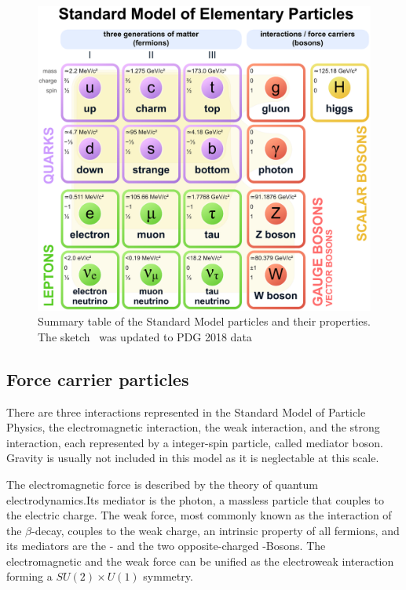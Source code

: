 \begin{figure}
	\centering
	\includegraphics[width=\textwidth]{figures_SM/standard_model.eps}
	\caption[Standard Model particles]{Summary table of the Standard Model particles and their properties. The sketch~\cite{standard_model} was updated to PDG 2018 data~\cite{PDG}}
	\label{fig:sm}
\end{figure}



\subsection{Force carrier particles}

There are three interactions represented in the Standard Model of Particle Physics, the electromagnetic interaction, the weak interaction, and the strong interaction, each represented by a integer-spin particle, called mediator boson. Gravity is usually not included in this model as it is neglectable  at this scale. 

The electromagnetic force is described by the theory of quantum electrodynamics.Its mediator is the photon, a massless particle that couples to the electric charge.
The weak force, most commonly known as the interaction of the $\beta$-decay, couples to the weak charge, an intrinsic property of all fermions, and its mediators are the \PZ- and the two opposite-charged \PW-Bosons.
The electromagnetic and the weak force can be unified as the electroweak interaction forming a $SU(2) \times U(1)$ symmetry.

